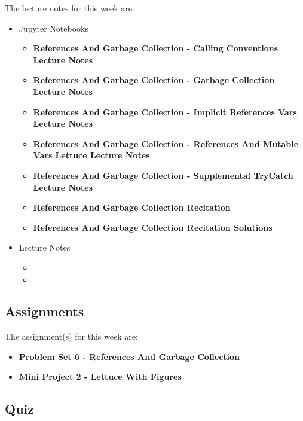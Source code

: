 \noindent The lecture notes for this week are:

\begin{itemize}
    \item Jupyter Notebooks
    \begin{itemize}
        \item \textbf{References And Garbage Collection - Calling Conventions Lecture Notes}
        \item \textbf{References And Garbage Collection - Garbage Collection Lecture Notes}
        \item \textbf{References And Garbage Collection - Implicit References Vars Lecture Notes}
        \item \textbf{References And Garbage Collection - References And Mutable Vars Lettuce Lecture Notes}
        \item \textbf{References And Garbage Collection - Supplemental TryCatch Lecture Notes}
        \item \textbf{References And Garbage Collection Recitation}
        \item \textbf{References And Garbage Collection Recitation Solutions}
    \end{itemize}
    \item Lecture Notes
    \begin{itemize}
        \item {}
        \item {}
    \end{itemize}
\end{itemize}

\subsection{Assignments}

The assignment(s) for this week are:

\begin{itemize}
    \item \textbf{Problem Set 6 - References And Garbage Collection}
    \item \textbf{Mini Project 2 - Lettuce With Figures}
\end{itemize}

\subsection{Quiz}

